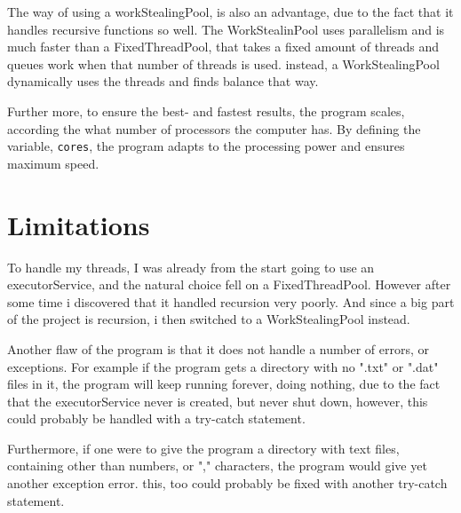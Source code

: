 \documentclass[11pt]{article}
\begin{document}
The way of using a workStealingPool, is also an advantage, due to the fact that it handles recursive functions so well. The WorkStealinPool uses parallelism and is much faster than a FixedThreadPool, that takes a fixed amount of threads and queues work when that number of threads is used. instead, a WorkStealingPool dynamically uses the threads and finds balance that way.

Further more, to ensure the best- and fastest results, the program scales, according the what number of processors the computer has. By defining the variable, \texttt{cores}, the program adapts to the processing power and ensures maximum speed.

\section{Limitations}
To handle my threads, I was already from the start going to use an executorService, and the natural choice fell on a FixedThreadPool. However after some time i discovered that it handled recursion very poorly. And since a big part of the project is recursion, i then switched to a WorkStealingPool instead.

Another flaw of the program is that it does not handle a number of errors, or exceptions. For example if the program gets a directory with no ".txt" or ".dat" files in it, the program will keep running forever, doing nothing, due to the fact that the executorService never is created, but never shut down, however, this could probably be handled with a try-catch statement.

Furthermore, if one were to give the program a directory with text files, containing other than numbers, or "," characters, the program would give yet another exception error. this, too could probably be fixed with another try-catch statement.
\end{document}
